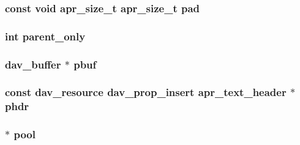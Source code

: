 \subsubsection[{\texorpdfstring{pad}{pad}}]{ const {\bf void} {\bf apr\+\_\+size\+\_\+t} {\bf apr\+\_\+size\+\_\+t} pad}\hypertarget{group__MOD__DAV_gace179413e6bb5f28178968aaf55ff4f6}{}\label{group__MOD__DAV_gace179413e6bb5f28178968aaf55ff4f6}
\subsubsection[{\texorpdfstring{parent\+\_\+only}{parent_only}}]{ {\bf int} parent\+\_\+only}\hypertarget{group__MOD__DAV_ga77494802fe3304b88fe3d4a28ccc7a46}{}\label{group__MOD__DAV_ga77494802fe3304b88fe3d4a28ccc7a46}
\subsubsection[{\texorpdfstring{pbuf}{pbuf}}]{ {\bf dav\+\_\+buffer} $\ast$ pbuf}\hypertarget{group__MOD__DAV_gae1a94d2dbbb7065be386af579bdbe312}{}\label{group__MOD__DAV_gae1a94d2dbbb7065be386af579bdbe312}
\subsubsection[{\texorpdfstring{phdr}{phdr}}]{\setlength{\rightskip}{0pt plus 5cm}const {\bf dav\+\_\+resource} {\bf dav\+\_\+prop\+\_\+insert} {\bf apr\+\_\+text\+\_\+header} $\ast$ phdr}\hypertarget{group__MOD__DAV_ga08f35dafe4ef680fc79b6e69d71c8f90}{}\label{group__MOD__DAV_ga08f35dafe4ef680fc79b6e69d71c8f90}
\subsubsection[{\texorpdfstring{pool}{pool}}]{$\ast$ pool}\hypertarget{group__MOD__DAV_ga35230907c170df5d4d7f0ca99274c574}{}\label{group__MOD__DAV_ga35230907c170df5d4d7f0ca99274c574}
